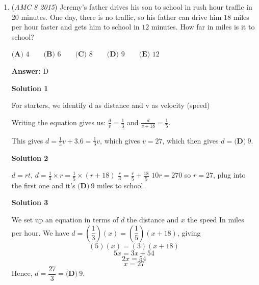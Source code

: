 \begin{enumerate}
\textbf{Solution 2 (Easy)}

We see that the minimum number of ninth graders is $6$, because if there are $3$ then there is $1$ ninth-grader with a buddy, which would mean there are $2.5$ sixth graders, which is impossible (of course unless you really do have half of a person). With $6$ ninth-graders, $2$ of them are in the buddy program, so there $\frac{2}{\frac{2}{5}}=5$ sixth-graders total, two of whom have a buddy. Thus, the desired fraction is $\frac{2+2}{5+6}=\boxed{\textbf{(B) }\frac{4}{11}}$.

 


 


 


	\item (\textit{AMC 8 2015}) Jeremy's father drives his son to school in rush hour traffic in $20$ minutes. One day, there is no traffic, so his father can drive him $18$ miles per hour faster and gets him to school in $12$ minutes. How far in miles is it to school?


 $\textbf{(A) } 4 \qquad \textbf{(B) } 6 \qquad \textbf{(C) } 8 \qquad \textbf{(D) } 9 \qquad \textbf{(E) } 12$

 \textbf{Answer: }D



\textbf{Solution 1}

For starters, we identify d as distance and v as velocity (speed)

 Writing the equation gives us: $\frac{d}{v}=\frac{1}{3}$ and $\frac{d}{v+18}=\frac{1}{5}$.

 This gives $d=\frac{1}{5}v+3.6=\frac{1}{3}v$, which gives $v=27$, which then gives $d=\boxed{\textbf{(D)}~9}$.

 



\textbf{Solution 2}

$d = rt$, $d=\frac{1}{3} \times r = \frac{1}{5} \times (r + 18)$
$\frac{r}{3} = \frac{r}{5} + \frac{18}{5}$
$10r = 270$ so $r = 27$, plug into the first one and it's $\boxed{\textbf{(D)}~9}$ miles to school.

 



\textbf{Solution 3}

We set up an equation in terms of $d$ the distance and $x$ the speed In miles per hour. We have $d=\left (\dfrac{1}{3}\right )(x)=\left (\dfrac{1}{5}\right) (x+18)$, giving
 \[(5)(x)=(3)(x+18)\]
 \[5x=3x+54\]
 \[2x=54\]
 \[x=27\]Hence, $d=\dfrac{27}{3}=\boxed{\textbf{(D)}~9}$.


\end{enumerate}
